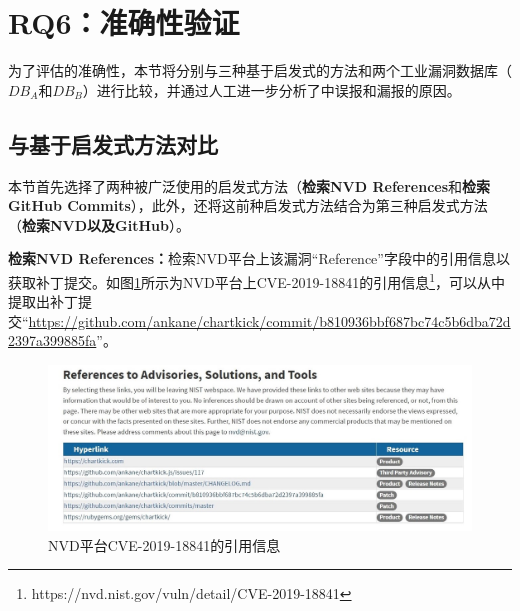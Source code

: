 \section{RQ6：准确性验证}\label{sec:accuracy-evaluation}

为了评估\tool 的准确性，本节将\tool 分别与三种基于启发式的方法和两个工业漏洞数据库（$DB_A$和$DB_B$）进行比较，并通过人工进一步分析了\tool 中误报和漏报的原因。

\subsection{与基于启发式方法对比}
本节首先选择了两种被广泛使用的启发式方法（\textbf{检索NVD References}和\textbf{检索GitHub Commits}），此外，还将这前种启发式方法结合为第三种启发式方法（\textbf{检索NVD以及GitHub}）。

\textbf{检索NVD References：}检索NVD平台上该漏洞“Reference”字段中的引用信息以获取补丁提交\cite{duan2019automating,li2016vulpecker,li2018vuldeepecker}。如图\ref{fig:CVE-2019-18841}所示为NVD平台上CVE-2019-18841的引用信息\footnote{https://nvd.nist.gov/vuln/detail/CVE-2019-18841}，可以从中提取出补丁提交“\url{https://github.com/ankane/chartkick/commit/b810936bbf687bc74c5b6dba72d2397a399885fa}”。
\begin{figure}[h]
    \centering
    \includegraphics[scale=0.44]{res/NVD-2019-18841}
    \caption{NVD平台CVE-2019-18841的引用信息}\label{fig:CVE-2019-18841}
\end{figure}


